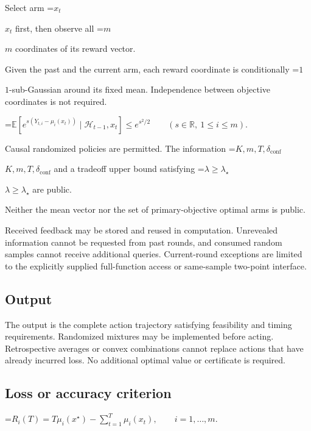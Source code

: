 \documentclass[10pt,a4paper]{article}
\newcommand{\AtlasMath}[1]{\par\begingroup\centering\setbox0=\hbox{$\displaystyle #1$}\ifdim\wd0>1.4\linewidth\typeout{ATLAS WIDE FORMULA: \the\wd0}\fi\ifdim\wd0>\linewidth\resizebox{\linewidth}{!}{\box0}\else\box0\fi\par\endgroup}
\newcommand{\AtlasInlineMath}[1]{\begingroup\setbox0=\hbox{$#1$}\ifdim\wd0>.4\linewidth\endgroup\AtlasMath{#1}\else\endgroup$#1$\fi}
\begin{document}
Select arm \AtlasInlineMath{x_t} first, then observe all \AtlasInlineMath{m} coordinates of its reward vector.



Given the past and the current arm, each reward coordinate is conditionally \AtlasInlineMath{1}-sub-Gaussian around its fixed mean. Independence between objective coordinates is not required.




\AtlasMath{\mathbb{E}\!\left[e^{s(Y_{t,i}-\mu_i(x_t))}\mid\mathcal{H}_{t-1},x_t\right]\le e^{s^2/2}\qquad(s\in\mathbb{R},\ 1\le i\le m).}




Causal randomized policies are permitted. The information \AtlasInlineMath{K,m,T,\delta_{\mathrm{conf}}} and a tradeoff upper bound satisfying \AtlasInlineMath{\lambda\ge\lambda_\star} are public.



Neither the mean vector nor the set of primary-objective optimal arms is public.



Received feedback may be stored and reused in computation. Unrevealed information cannot be requested from past rounds, and consumed random samples cannot receive additional queries. Current-round exceptions are limited to the explicitly supplied full-function access or same-sample two-point interface.



\subsection{Output}


The output is the complete action trajectory satisfying feasibility and timing requirements. Randomized mixtures may be implemented before acting. Retrospective averages or convex combinations cannot replace actions that have already incurred loss. No additional optimal value or certificate is required.



\subsection{Loss or accuracy criterion}



\AtlasMath{R_i(T)=T\mu_i(x^\star)-\sum_{t=1}^{T}\mu_i(x_t),\qquad i=1,\ldots,m.}
\end{document}
